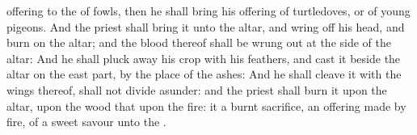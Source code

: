 {offering to the
{}
{} of
fowls, then he shall
bring his
offering of
turtledoves, or of
young
pigeons.
And the
priest shall
bring it unto the
altar, and wring
off his
head, and
burn
{} on the
altar; and the
blood thereof shall be wrung
out at the
side of the
altar:
And he shall pluck
away his
crop with his
feathers, and
cast it
beside the
altar on the east
part, by the
place of the
ashes:
And he shall
cleave it with the
wings thereof,
{} shall not divide
{}
asunder: and the
priest shall
burn it upon the
altar, upon the
wood that
{} upon the
fire: it
{} a burnt
sacrifice, an offering made by
fire, of a
sweet
savour unto the
{}.

}

